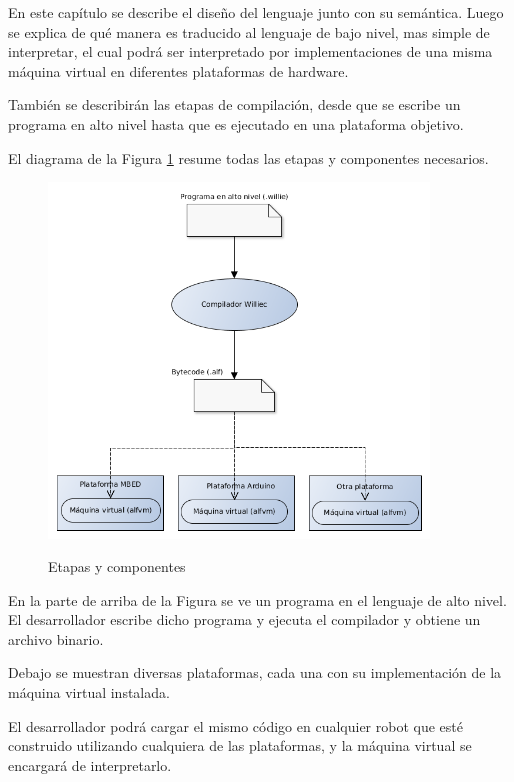 
  En este capítulo se describe el diseño del lenguaje \frob{} junto con su semántica.
  Luego se explica de qué manera es traducido al lenguaje \alf{} de
bajo nivel, mas simple de interpretar, el cual podrá ser interpretado
por implementaciones de una misma máquina virtual en diferentes
plataformas de hardware.

  También se describirán las etapas de compilación, desde que se escribe
un programa en alto nivel hasta que es ejecutado en una
plataforma objetivo.

  El diagrama de la Figura \ref{fig:compilacion} resume todas las etapas y
componentes necesarios.

\begin{figure}[h]
\begin{center}
\caption{Etapas y componentes}
\includegraphics[width=0.9\textwidth]{graphs/compilacion.png}
\label{fig:compilacion}
\end{center}
\end{figure}

  En la parte de arriba de la Figura se ve un programa en el
lenguaje \frob{} de alto nivel.
  El desarrollador escribe dicho programa y
ejecuta el compilador \compilador{} y obtiene un archivo \alf{} binario.

  Debajo se muestran diversas plataformas, cada una
con su implementación de la máquina virtual \maquinavirtual{} instalada.

  El desarrollador podrá cargar el mismo código \alf{} en cualquier robot que
esté construido utilizando cualquiera de las plataformas, y la máquina
virtual se encargará de interpretarlo.
